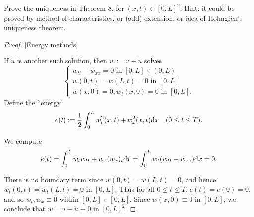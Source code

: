 \begin{pro}
  Prove the uniqueness in Theorem 8,
  for $(x,t)\in[0, L]^2$.
  Hint: it could be proved by method of characteristics,
  or (odd) extension,
  or idea of Holmgren's uniqueness theorem.
\end{pro}

\begin{proof}
  
  [Energy methods]
  
  If $\tilde{u}$ is another such solution,
  then $w := u-\tilde{u}$ solves
  \begin{displaymath}
    \begin{cases}
      w_{tt} - w_{xx} = 0 \text{ in }[0, L]\times(0, L) \\
      w(0, t) = w(L, t) = 0 \text{ in } [0, L] \\
      w(x, 0) = 0, w_t(x, 0) = 0 \text{ in } [0, L].
    \end{cases}
  \end{displaymath}
  Define the ``energy''
  \begin{displaymath}
    e(t) := \frac{1}{2}\int_0^Lw_t^2(x, t) + w_x^2(x, t)\mathrm{d} x \quad
    (0\le t \le T).
  \end{displaymath}

  We compute
  \begin{displaymath}
    \dot{e}(t) = \int_0^Lw_tw_{tt} + w_x(w_x)_t \mathrm{d} x
    = \int_0^Lw_t(w_{tt}-w_{xx})\mathrm{d} x=0.
  \end{displaymath}

  There is no boundary term since $w(0, t)=w(L,t)=0$,
  and hence $w_t(0,t)=w_t(L,t)=0$ in $[0, L]$.
  Thus for all $0\le t\le T$, $e(t)=e(0)=0$,
  and so $w_t, w_x\equiv 0$ within $[0, L]\times[0, L]$.
  Since $w(x, 0)\equiv 0$ in $[0, L]$,
  we conclude that $w=u-\tilde{u}\equiv 0$ in $[0, L]^2$.
\end{proof}
